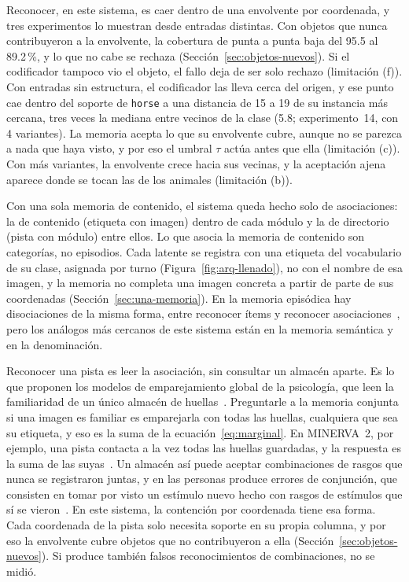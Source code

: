 Reconocer, en este sistema, es caer dentro de una envolvente por coordenada, y tres
experimentos lo muestran desde entradas distintas.
Con objetos que nunca contribuyeron a la envolvente, la cobertura de punta a punta baja
del 95.5 al 89.2\,\%, y lo que no cabe se rechaza (Sección~\ref{sec:objetos-nuevos}).
Si el codificador tampoco vio el objeto, el fallo deja de ser solo rechazo
(limitación (f)).
Con entradas sin estructura, el codificador las lleva cerca del origen, y ese punto
cae dentro del soporte de \texttt{horse} a una distancia de 15 a 19 de su instancia más
cercana, tres veces la mediana entre vecinos de la clase (5.8; experimento~14, con 4
variantes).
La memoria acepta lo que su envolvente cubre, aunque no se parezca a nada que haya
visto, y por eso el umbral $\tau$ actúa antes que ella (limitación (c)).
Con más variantes, la envolvente crece hacia sus vecinas, y la aceptación ajena aparece
donde se tocan las de los animales (limitación (b)).

Con una sola memoria de contenido, el sistema queda hecho solo de asociaciones: la de
contenido (etiqueta con imagen) dentro de cada módulo y la de directorio (pista con
módulo) entre ellos.
Lo que asocia la memoria de contenido son categorías, no episodios.
Cada latente se registra con una etiqueta del vocabulario de su clase, asignada por turno
(Figura~\ref{fig:arq-llenado}), no con el nombre de esa imagen, y la memoria no completa
una imagen concreta a partir de parte de sus coordenadas
(Sección~\ref{sec:una-memoria}).
En la memoria episódica hay disociaciones de la misma forma, entre reconocer ítems y
reconocer asociaciones~\cite{mayes2004associative,old2008differential}, pero los
análogos más cercanos de este sistema están en la memoria semántica y en la
denominación.

Reconocer una pista es leer la asociación, sin consultar un almacén aparte.
Es lo que proponen los modelos de emparejamiento global de la psicología, que leen la
familiaridad de un único almacén de huellas~\cite{clark1996global}.
Preguntarle a la memoria conjunta si una imagen es familiar es emparejarla con todas las
huellas, cualquiera que sea su etiqueta, y eso es la suma de la
ecuación~\eqref{eq:marginal}.
En MINERVA~2, por ejemplo, una pista contacta a la vez todas las huellas guardadas, y
la respuesta es la suma de las suyas~\cite{hintzman1984minerva}.
Un almacén así puede aceptar combinaciones de rasgos que nunca se registraron juntas, y
en las personas produce errores de conjunción, que consisten en tomar por visto un
estímulo nuevo hecho con rasgos de estímulos que sí se vieron~\cite{reinitz1992memory}.
En este sistema, la contención por coordenada tiene esa forma.
Cada coordenada de la pista solo necesita soporte en su propia columna, y por eso la
envolvente cubre objetos que no contribuyeron a ella (Sección~\ref{sec:objetos-nuevos}).
Si produce también falsos reconocimientos de combinaciones, no se midió.

